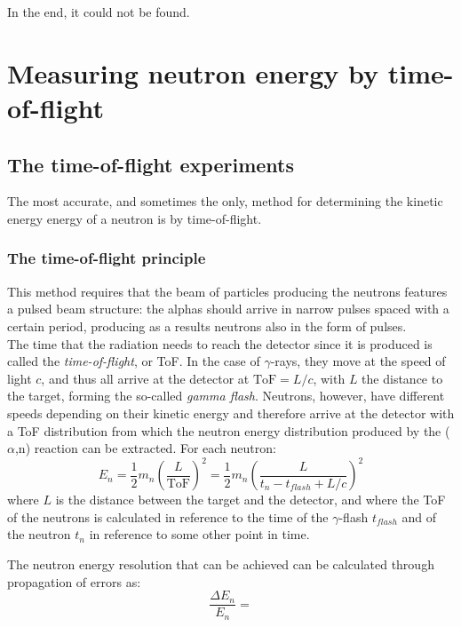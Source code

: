 \documentclass[a4paper,12pt]{report}
\newcommand{\an}{($\alpha$,n) }
\begin{document}
In the end, it could not be found.



\chapter{Measuring neutron energy by time-of-flight}

\section{The time-of-flight experiments}
The most accurate, and sometimes the only, method for determining the kinetic energy energy of a neutron is by time-of-flight.

\subsection{The time-of-flight principle} 
This method requires that the beam of particles producing the neutrons features a pulsed beam structure: the alphas should arrive in narrow pulses spaced with a certain period, producing as a results neutrons also in the form of pulses.
\\

The time that the radiation needs to reach the detector since it is produced is called the \textit{time-of-flight}, or ToF.
In the case of $\gamma$-rays, they move at the speed of light $c$, and thus all arrive at the detector at $\text{ToF}=L/c$, with $L$ the distance to the target, forming the so-called  \textit{gamma flash}.
Neutrons, however, have different speeds depending on their kinetic energy and therefore arrive at the detector with a ToF distribution from which the neutron energy distribution produced by the \an reaction can be extracted.
For each neutron:
\begin{equation}
	E_n=\frac{1}{2} m_n \left( \frac{L}{\text{ToF}} \right)^2 = \frac{1}{2} m_n \left( \frac{L}{t_n - t_{flash} + L/c} \right)^2
	\label{Eq_ToF2En}
\end{equation}
where $L$ is the distance between the target and the detector, and where the ToF of the neutrons is calculated in reference to the time of the $\gamma$-flash $t_{flash}$ and of the neutron $t_n$ in reference to some other point in time.

The neutron energy resolution that can be achieved can be calculated through propagation of errors as:
\begin{equation}
    \frac{\Delta E_n}{E_n} =
    \label{Eq_Enresolution}
\end{equation}
\end{document}
